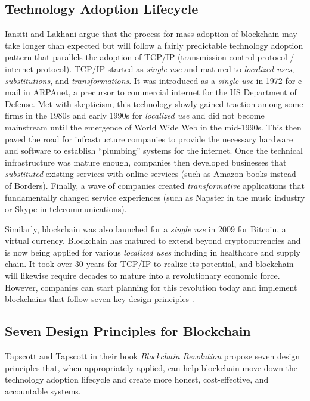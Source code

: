\documentclass[sigconf]{acmart}
\begin{document}
\subsection{Technology Adoption Lifecycle}
Iansiti and Lakhani \cite{hbr} argue that the process for mass adoption of blockchain may take longer than expected but will follow a fairly predictable technology adoption pattern that parallels the adoption of TCP/IP (transmission control protocol / internet protocol). TCP/IP started as \textit{single-use} and matured to \textit{localized uses}, \textit{substitutions}, and \textit{transformations}. It was introduced as a \textit{single-use} in 1972 for e-mail in ARPAnet, a precursor to commercial internet for the US Department of Defense. Met with skepticism, this technology slowly gained traction among some firms in the 1980s and early 1990s for \textit{localized use} and did not become mainstream until the emergence of World Wide Web in the mid-1990s. This then paved the road for infrastructure companies to provide the necessary hardware and software to establish ``plumbing'' systems for the internet. Once the technical infrastructure was mature enough, companies then developed businesses that \textit{substituted} existing services with online services (such as Amazon books instead of Borders). Finally, a wave of companies created \textit{transformative} applications that fundamentally changed service experiences (such as Napster in the music industry or Skype in telecommunications).

Similarly, blockchain was also launched for a \textit{single use} in 2009 for Bitcoin, a virtual currency. Blockchain has matured to extend beyond cryptocurrencies and is now being applied for various \textit{localized uses} including in healthcare and supply chain. It took over 30 years for TCP/IP to realize its potential, and blockchain will likewise require decades to mature into a revolutionary economic force. However, companies can start planning for this revolution today and implement blockchains that follow seven key design principles \cite{hbr} \cite{tapscott}.

\subsection{Seven Design Principles for Blockchain}
Tapscott and Tapscott \cite{tapscott} in their book \textit{Blockchain Revolution} propose seven design principles that, when appropriately applied, can help blockchain move down the technology adoption lifecycle and create more honest, cost-effective, and accountable systems.
\end{document}
